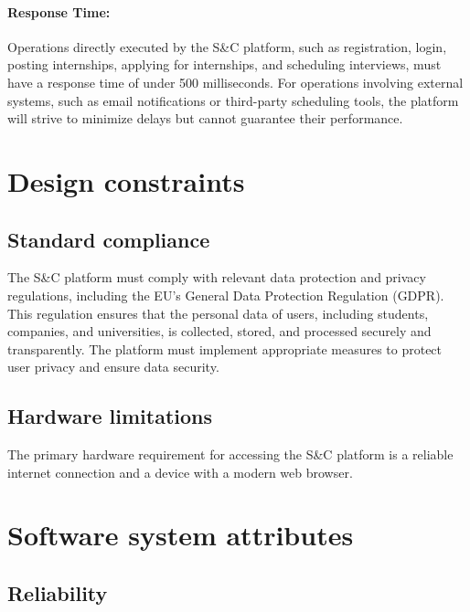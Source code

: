 \paragraph{Response Time:}
  Operations directly executed by the S\&C platform, such as
  registration, login, posting internships, applying for internships,
  and scheduling interviews, must have a response time of under 500
  milliseconds. For operations involving external systems, such as email
  notifications or third-party scheduling tools, the platform will
  strive to minimize delays but cannot guarantee their performance.

\section{Design constraints}
\label{sec:design_constraints}%


\subsection{Standard compliance}
\label{subsec:standard compliance}%


The S\&C platform must comply with relevant data protection and privacy
regulations, including the EU's General Data Protection Regulation
(GDPR). This regulation ensures that the personal data of users,
including students, companies, and universities, is collected, stored,
and processed securely and transparently. The platform must implement
appropriate measures to protect user privacy and ensure data security.


\subsection{Hardware limitations}
\label{subsec:hardware_limitations}%


The primary hardware requirement for accessing the S\&C platform is a
reliable internet connection and a device with a modern web browser.


\section{Software system attributes}
\label{sec:software_system_attributes}%


\subsection{Reliability}
\label{subsec:reliability}%


